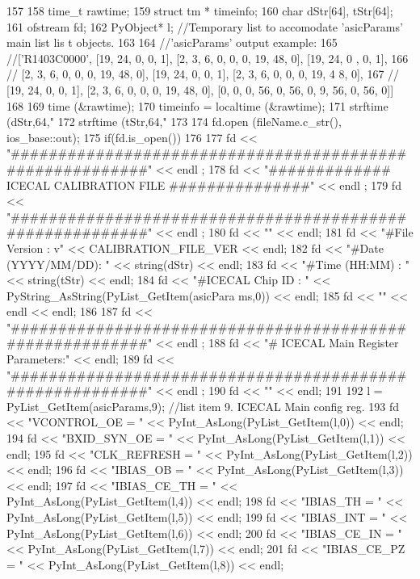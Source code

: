 \begin{DoxyCode}
157 {
158   time_t rawtime;
159   struct tm * timeinfo;
160     char dStr[64], tStr[64];
161     ofstream fd;
162     PyObject* l;        //Temporary list to accomodate 'asicParams' main list lis
      t objects.
163 
164     //'asicParams' output example:
165     //['R1403C0000', [19, 24, 0, 0, 1], [2, 3, 6, 0, 0, 0, 19, 48, 0], [19, 24, 0
      , 0, 1],
166     // [2, 3, 6, 0, 0, 0, 19, 48, 0], [19, 24, 0, 0, 1], [2, 3, 6, 0, 0, 0, 19, 4
      8, 0], 
167     // [19, 24, 0, 0, 1], [2, 3, 6, 0, 0, 0, 19, 48, 0], [0, 0, 0, 56, 0, 56, 0, 
      9, 56, 0, 56, 0]]
168 
169   time (&rawtime);
170   timeinfo = localtime (&rawtime);
171     strftime (dStr,64,"%
172     strftime (tStr,64,"%
173 
174     fd.open (fileName.c_str(), ios_base::out);
175     if(fd.is_open())
176     {
177         fd << "#########################################################" << endl
      ;
178         fd << "#############   ICECAL CALIBRATION FILE   ###############" << endl
      ;
179         fd << "#########################################################" << endl
      ;
180         fd << "" << endl;
181         fd << "#File Version     : v" << CALIBRATION_FILE_VER << endl;
182         fd << "#Date (YYYY/MM/DD): " << string(dStr) << endl;
183         fd << "#Time (HH:MM)     : " << string(tStr) << endl;
184         fd << "#ICECAL Chip ID   : " << PyString_AsString(PyList_GetItem(asicPara
      ms,0)) << endl;
185         fd << "" << endl << endl;
186     
187         fd << "#########################################################" << endl
      ;
188         fd << "# ICECAL Main Register Parameters:" << endl;
189         fd << "#########################################################" << endl
      ;
190         fd << "" << endl;
191 
192         l = PyList_GetItem(asicParams,9);       //list item 9. ICECAL Main config
       reg.
193         fd <<   "VCONTROL_OE = " << PyInt_AsLong(PyList_GetItem(l,0)) << endl;
194         fd <<   "BXID_SYN_OE = " << PyInt_AsLong(PyList_GetItem(l,1)) << endl;
195         fd <<   "CLK_REFRESH = " << PyInt_AsLong(PyList_GetItem(l,2)) << endl;
196         fd <<   "IBIAS_OB    = " << PyInt_AsLong(PyList_GetItem(l,3)) << endl;
197         fd <<   "IBIAS_CE_TH = " << PyInt_AsLong(PyList_GetItem(l,4)) << endl;
198         fd <<   "IBIAS_TH    = " << PyInt_AsLong(PyList_GetItem(l,5)) << endl;
199         fd <<   "IBIAS_INT   = " << PyInt_AsLong(PyList_GetItem(l,6)) << endl;
200         fd <<   "IBIAS_CE_IN = " << PyInt_AsLong(PyList_GetItem(l,7)) << endl;
201         fd <<   "IBIAS_CE_PZ = " << PyInt_AsLong(PyList_GetItem(l,8)) << endl;  
}}
\end{DoxyCode}
